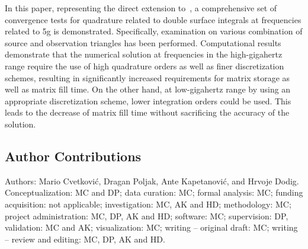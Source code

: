 In this paper, representing the direct extension to~\cite{Cvetkovic2021Study}, a comprehensive set of convergence tests for quadrature related to double surface integrals at frequencies related to \gls{5g} is demonstrated.
Specifically, examination on various combination of source and observation triangles has been performed.
Computational results demonstrate that the numerical solution at frequencies in the high-gigahertz range require the use of high quadrature orders as well as finer discretization schemes, resulting in significantly increased requirements for matrix storage as well as matrix fill time.
On the other hand, at low-gigahertz range by using an appropriate discretization scheme, lower integration orders could be used.
This leads to the decrease of matrix fill time without sacrificing the accuracy of the solution.

\subsection{Author Contributions}
Authors: Mario Cvetković, Dragan Poljak, Ante Kapetanović, and Hrvoje Dodig.\\
Conceptualization: MC and DP; data curation: MC; formal analysis: MC; funding acquisition: not applicable; investigation: MC, AK and HD; methodology: MC; project administration: MC, DP, AK and HD; software: MC; supervision: DP, validation: MC and AK; visualization: MC; writing -- original draft: MC; writing -- review and editing: MC, DP, AK and HD.
